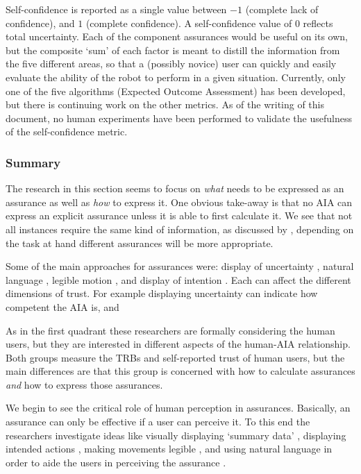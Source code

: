 Self-confidence is reported as a single value between $-1$ (complete lack of confidence), and $1$ (complete confidence). A self-confidence value of $0$ reflects total uncertainty. Each of the component assurances would be useful on its own, but the composite `sum' of each factor is meant to distill the information from the five different areas, so that a (possibly novice) user can quickly and easily evaluate the ability of the robot to perform in a given situation. Currently, only one of the five algorithms (Expected Outcome Assessment) has been developed, but there is continuing work on the other metrics. As of the writing of this document, no human experiments have been performed to validate the usefulness of the self-confidence metric. 

\subsubsection{Summary}
The research in this section seems to focus on \emph{what} needs to be expressed as an assurance as well as \emph{how} to express it. One obvious take-away is that no AIA can express an explicit assurance unless it is able to first calculate it. We see that not all instances require the same kind of information, as discussed by \cite{Chen2014-dk}, depending on the task at hand different assurances will be more appropriate.

Some of the main approaches for assurances were: display of uncertainty \cite{Muir1996-gt,Aitken2016-fb}, natural language \cite{Wang2016-id}, legible motion \cite{Dragan2013-wd}, and display of intention \cite{Chadalavada2015-wx}. Each can affect the different dimensions of trust. For example displaying uncertainty can indicate how competent the AIA is, and  

As in the first quadrant these researchers are formally considering the human users, but they are interested in different aspects of the human-AIA relationship. Both groups measure the TRBs and self-reported trust of human users, but the main differences are that this group is concerned with how to calculate assurances \emph{and} how to express those assurances.

We begin to see the critical role of human perception in assurances. Basically, an assurance can only be effective if a user can perceive it. To this end the researchers investigate ideas like visually displaying `summary data' \cite{Muir1996-gt}, displaying intended actions \cite{Chadalavada2015-wx}, making movements legible \cite{Dragan2013-wd}, and using natural language in order to aide the users in perceiving the assurance \cite{Wang2016-id}.

